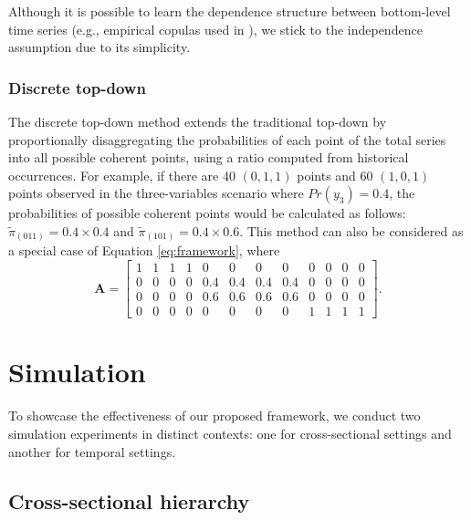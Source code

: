 \documentclass[a4paper,review,12pt,authoryear]{elsarticle}
\begin{document}
    Although it is possible to learn the dependence structure between bottom-level time series (e.g., empirical copulas used in \citealp{bentaiebHierarchicalProbabilisticForecasting2020}), we stick to the independence assumption due to its simplicity.

    \subsubsection*{\textbf{Discrete top-down}}

    The discrete top-down method extends the traditional top-down by proportionally disaggregating the probabilities of each point of the total series into all possible coherent points, using a ratio computed from historical occurrences.
    For example, if there are $40$ $(0, 1, 1)$ points and $60$ $(1, 0, 1) $ points observed in the three-variables scenario where $Pr(y_3) = 0.4$, the probabilities of possible coherent points would be calculated as follows: $\tilde \pi_{(011)} = 0.4\times 0.4$ and $\tilde \pi_{(101)} = 0.4\times 0.6$.
    This method can also be considered as a special case of Equation \eqref{eq:framework}, where
    \[
    \mathbf{A} = \left[\begin{matrix}
      1 & 1 & 1 & 1 & 0 & 0 & 0 & 0 & 0 & 0 & 0 & 0 \\
      0 & 0 & 0 & 0 & 0.4 & 0.4 & 0.4 & 0.4 & 0 & 0 & 0 & 0 \\
      0 & 0 & 0 & 0 & 0.6 & 0.6 & 0.6 & 0.6 & 0 & 0 & 0 & 0 \\
      0 & 0 & 0 & 0 & 0 & 0 & 0 & 0 & 1 & 1 & 1 & 1
    \end{matrix}\right].
    \]

\section{Simulation}
\label{sec:simulation}

To showcase the effectiveness of our proposed framework, we conduct two simulation experiments in distinct contexts: one for cross-sectional settings and another for temporal settings.

  \subsection{Cross-sectional hierarchy}
  \label{sec:cross-sectional_simu}
\end{document}
